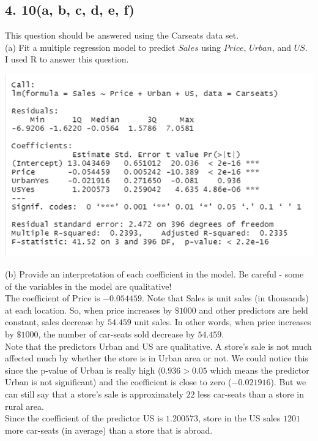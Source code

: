 \documentclass{article}
\begin{document}
\subsection*{4. 10(a, b, c, d, e, f)}
This question should be answered using the Carseats data set. \\
(a) Fit a multiple regression model to predict $Sales$ using $Price$, $Urban$, and $US$. \\
\indent I used R to answer this question.
\begin{center}
\includegraphics[scale = 0.46]{4.10.a.png} \\
\end{center}
(b) Provide an interpretation of each coefficient in the model. Be careful - some of the variables in the model are qualitative! \\
\indent \indent The coefficient of Price is $-0.054459$. Note that Sales is unit sales (in thousands) at each location. So, when price increases by $\$1000$ and other predictors are held constant, sales decrease by $54.459$ unit sales. In other words, when price increases by $\$1000$, the number of car-seats sold decrease by $54.459$. \\
\indent \indent Note that the predictors Urban and US are qualitative. A store’s sale is not much affected much by whether the store is in Urban area or not. We could notice this since the p-value of Urban is really high ($0.936   > 0.05$ which means the predictor Urban is not significant) and the coefficient is close to zero ($-0.021916$). But we can still say that a store's sale is approximately $22$ less car-seats than a store in rural area. \\
Since the coefficient of the predictor US is $1.200573$, store in the US sales $1201$ more car-seats (in average) than a store that is abroad. \\
\end{document}
